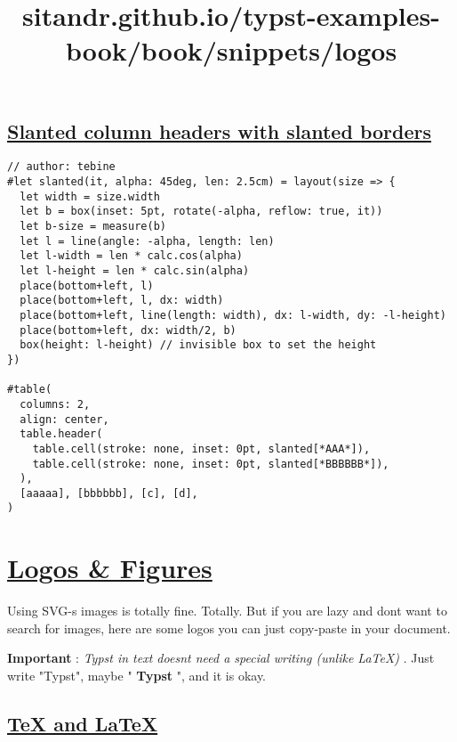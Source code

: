 \pandocbounded{}

\subsection{\texorpdfstring{\hyperref[slanted-column-headers-with-slanted-borders]{Slanted
column headers with slanted
borders}}{Slanted column headers with slanted borders}}\label{slanted-column-headers-with-slanted-borders}

\begin{verbatim}
// author: tebine
#let slanted(it, alpha: 45deg, len: 2.5cm) = layout(size => {
  let width = size.width
  let b = box(inset: 5pt, rotate(-alpha, reflow: true, it))
  let b-size = measure(b)
  let l = line(angle: -alpha, length: len)
  let l-width = len * calc.cos(alpha)
  let l-height = len * calc.sin(alpha)
  place(bottom+left, l)
  place(bottom+left, l, dx: width)
  place(bottom+left, line(length: width), dx: l-width, dy: -l-height)
  place(bottom+left, dx: width/2, b)
  box(height: l-height) // invisible box to set the height
})

#table(
  columns: 2,
  align: center,
  table.header(
    table.cell(stroke: none, inset: 0pt, slanted[*AAA*]),
    table.cell(stroke: none, inset: 0pt, slanted[*BBBBBB*]),
  ),
  [aaaaa], [bbbbbb], [c], [d],
)
\end{verbatim}

\pandocbounded{}


\title{sitandr.github.io/typst-examples-book/book/snippets/logos}

\section{\texorpdfstring{\hyperref[logos--figures]{Logos \&
Figures}}{Logos \& Figures}}\label{logos--figures}

Using SVG-s images is totally fine. Totally. But if you are lazy and
don\textquotesingle t want to search for images, here are some logos you
can just copy-paste in your document.

\textbf{Important} : \emph{Typst in text doesn\textquotesingle t need a
special writing (unlike LaTeX)} . Just write "Typst", maybe "
\textbf{Typst} ", and it is okay.

\subsection{\texorpdfstring{\hyperref[tex-and-latex]{TeX and
LaTeX}}{TeX and LaTeX}}\label{tex-and-latex}

